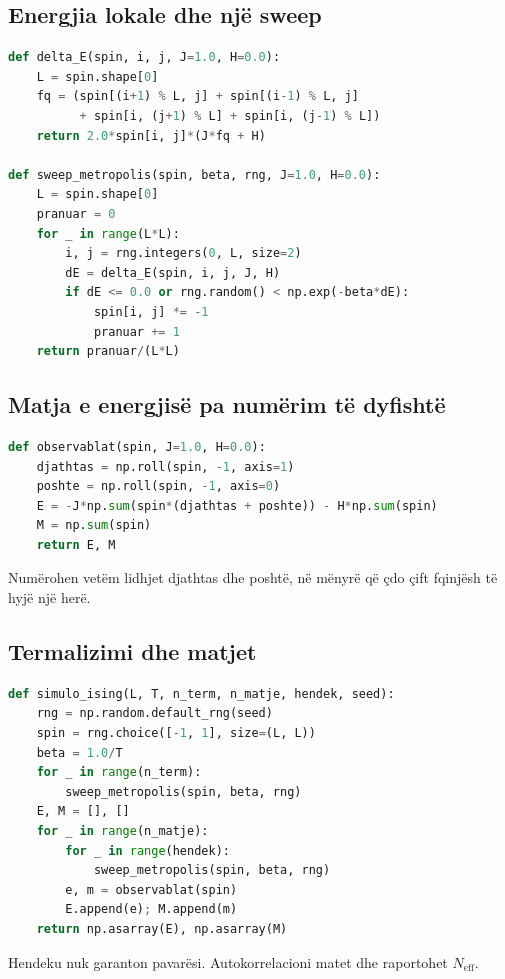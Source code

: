 \documentclass[11pt,oneside,openany]{book}
\begin{document}
\subsection{Energjia lokale dhe një sweep}
\begin{lstlisting}[language=Python,caption={Përditësimi Metropolis me një spin.}]
def delta_E(spin, i, j, J=1.0, H=0.0):
    L = spin.shape[0]
    fq = (spin[(i+1) % L, j] + spin[(i-1) % L, j]
          + spin[i, (j+1) % L] + spin[i, (j-1) % L])
    return 2.0*spin[i, j]*(J*fq + H)

def sweep_metropolis(spin, beta, rng, J=1.0, H=0.0):
    L = spin.shape[0]
    pranuar = 0
    for _ in range(L*L):
        i, j = rng.integers(0, L, size=2)
        dE = delta_E(spin, i, j, J, H)
        if dE <= 0.0 or rng.random() < np.exp(-beta*dE):
            spin[i, j] *= -1
            pranuar += 1
    return pranuar/(L*L)
\end{lstlisting}

\subsection{Matja e energjisë pa numërim të dyfishtë}
\begin{lstlisting}[language=Python]
def observablat(spin, J=1.0, H=0.0):
    djathtas = np.roll(spin, -1, axis=1)
    poshte = np.roll(spin, -1, axis=0)
    E = -J*np.sum(spin*(djathtas + poshte)) - H*np.sum(spin)
    M = np.sum(spin)
    return E, M
\end{lstlisting}
Numërohen vetëm lidhjet djathtas dhe poshtë, në mënyrë që çdo çift fqinjësh të hyjë një herë.

\subsection{Termalizimi dhe matjet}
\begin{lstlisting}[language=Python,caption={Struktura e një simulimi të plotë.}]
def simulo_ising(L, T, n_term, n_matje, hendek, seed):
    rng = np.random.default_rng(seed)
    spin = rng.choice([-1, 1], size=(L, L))
    beta = 1.0/T
    for _ in range(n_term):
        sweep_metropolis(spin, beta, rng)
    E, M = [], []
    for _ in range(n_matje):
        for _ in range(hendek):
            sweep_metropolis(spin, beta, rng)
        e, m = observablat(spin)
        E.append(e); M.append(m)
    return np.asarray(E), np.asarray(M)
\end{lstlisting}
Hendeku nuk garanton pavarësi. Autokorrelacioni matet dhe raportohet $N_{\mathrm{eff}}$.
\end{document}
